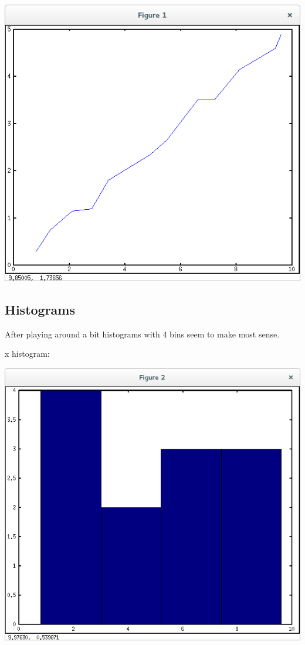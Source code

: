 \documentclass[10pt,a4paper]{article}
\begin{document}
\includegraphics[scale=0.7]{fig1}

\pagebreak
\subsection*{Histograms}

After playing around a bit histograms with 4 bins seem to make most sense.

x histogram:

\includegraphics[scale=0.6]{xhist}
\end{document}
